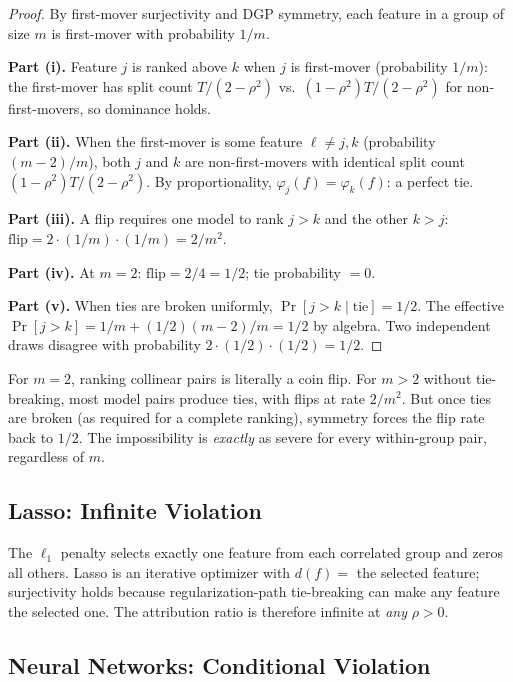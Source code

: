 \documentclass{jmlr}
\begin{document}
\begin{proof}
By first-mover surjectivity and DGP symmetry, each feature in a group of size $m$ is first-mover with probability $1/m$.

\textbf{Part (i).} Feature $j$ is ranked above $k$ when $j$ is first-mover (probability $1/m$): the first-mover has split count $T/(2-\rho^2)$ vs.\ $(1-\rho^2)T/(2-\rho^2)$ for non-first-movers, so dominance holds.

\textbf{Part (ii).} When the first-mover is some feature $\ell \neq j, k$ (probability $(m-2)/m$), both $j$ and $k$ are non-first-movers with identical split count $(1-\rho^2)T/(2-\rho^2)$. By proportionality, $\varphi_j(f) = \varphi_k(f)$: a perfect tie.

\textbf{Part (iii).} A flip requires one model to rank $j > k$ and the other $k > j$: $\text{flip} = 2 \cdot (1/m) \cdot (1/m) = 2/m^2$.

\textbf{Part (iv).} At $m=2$: $\text{flip} = 2/4 = 1/2$; tie probability $= 0$.

\textbf{Part (v).} When ties are broken uniformly, $\Pr[j > k \mid \text{tie}] = 1/2$. The effective $\Pr[j > k] = 1/m + (1/2)(m-2)/m = 1/2$ by algebra. Two independent draws disagree with probability $2 \cdot (1/2) \cdot (1/2) = 1/2$.
\end{proof}

For $m = 2$, ranking collinear pairs is literally a coin flip. For $m > 2$ without tie-breaking, most model pairs produce ties, with flips at rate $2/m^2$. But once ties are broken (as required for a complete ranking), symmetry forces the flip rate back to $1/2$. The impossibility is \emph{exactly} as severe for every within-group pair, regardless of $m$.

\subsection{Lasso: Infinite Violation}
\label{sec:lasso}

The $\ell_1$ penalty selects exactly one feature from each correlated group and zeros all others. Lasso is an iterative optimizer with $d(f) =$ the selected feature; surjectivity holds because regularization-path tie-breaking can make any feature the selected one. The attribution ratio is therefore infinite at \emph{any} $\rho > 0$.

\subsection{Neural Networks: Conditional Violation}
\label{sec:nn}
\end{document}

